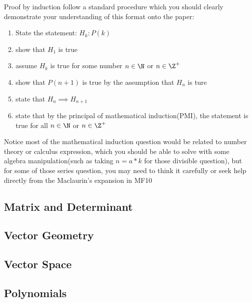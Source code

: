 \documentclass[]{article}
\begin{document}
Proof by induction follow a standard procedure which you should clearly
demonstrate your understanding of this format onto the paper:

\begin{enumerate}
\def\labelenumi{\arabic{enumi}.}
\item
  State the statement: \(H_k : P(k)\)
\item
  show that \(H_1\) is true
\item
  assume \(H_k\) is true for some number \(n\in \N\) or \(n \in \Z^+\)
\item
  show that \(P(n+1)\) is true by the assumption that \(H_n\) is ture
\item
  state that \(H_n \implies H_{n+1}\)
\item
  state that by the principal of mathematical induction(PMI), the
  statement is true for all \(n\in \N\) or \(n \in \Z^+\)
\end{enumerate}

Notice most of the mathematical induction question would be related to
number theory or calculus expression, which you should be able to solve
with some algebra manipulation(such as taking \(n = a*k\) for those
divisible question), but for some of those series question, you may need
to think it carefully or seek help directly from the Maclaurin's
expansion in MF10

\subsection{Matrix and Determinant}\label{header-n1204}

\subsection{Vector Geometry}\label{header-n1207}

\subsection{Vector Space}\label{header-n1210}

\subsection{Polynomials}\label{header-n1215}

\subsection{ }\label{header-n1220}
\end{document}
